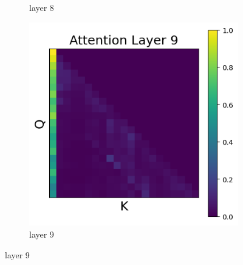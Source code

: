 \documentclass[11pt]{article}
\begin{document}
\begin{figure}[t]
\begin{subfigure}[t]{0.24\textwidth}
    \caption{layer 8}
  \end{subfigure}\hfill
      \begin{subfigure}[t]{0.24\textwidth}
    \centering
    \includegraphics[width=1.4\columnwidth]{figures/intervention4/layer_9.png}
    \caption{layer 9}
  \end{subfigure}\hfill
    

\end{figure}
\end{document}
